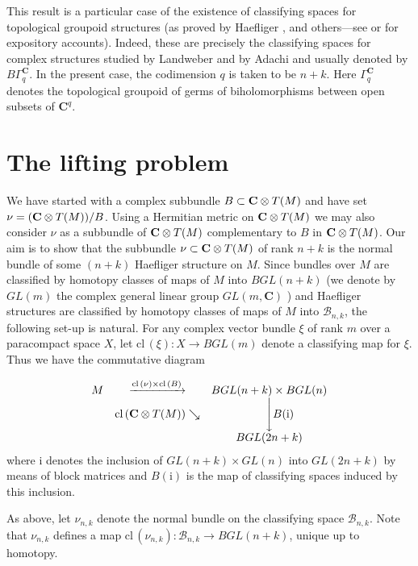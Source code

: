 \documentclass{amsart}
\begin{document}
This result is a particular case  of  the existence of classifying
spaces for topological groupoid structures (as proved by Haefliger \cite{Haef1}, \cite{Haef2} and
others---see \cite[page 48]{La2} or \cite[page 312]{Milnor} for
expository accounts).  Indeed, 
these are precisely the classifying spaces  for complex structures studied by
Landweber \cite{Land} and by Adachi \cite{Ad} and usually denoted by $B\Gamma_q^{\mathbf{C}}$.  In the present case, the codimension $q$ is taken to be $n+k$.  
Here $\Gamma_q^{\mathbf{C}}$ denotes the topological groupoid of germs of biholomorphisms between open subsets of 
${\mathbf{C}} ^q$.  

\section{The lifting problem}\label{lift}

We have started with a complex subbundle $B\subset {{\bf{C}}\otimes T(M)}$ and have set $\nu= ({{\bf{C}}\otimes T(M)})
/B$.  Using a Hermitian metric on ${{\bf{C}}\otimes T(M)}$ we may also consider $\nu$ as a
subbundle of ${{\bf{C}}\otimes T(M)}$ complementary to $B$ in ${{\bf{C}}\otimes T(M)}$.  Our aim is to show that the subbundle $\nu
\subset {{\bf{C}}\otimes T(M)}$ of rank $n+k$ is the normal bundle of some $(n+k)$
Haefliger structure on $M$.  Since bundles over $M$ are classified by homotopy
classes of maps of $M$ into $BGL(n+k)$ (we denote by $GL(m)$ the complex general linear group 
$GL(m,\mathbf C)$ ) and Haefliger structures are
classified by homotopy classes of maps of $M$ into ${{\mathcal B}}_{n,k}$, the
following set-up is natural.
For any complex vector bundle $\xi$ of rank $m$ over a paracompact space $X$, let
$\mathrm{cl}\,(\xi): X \to BGL(m)$ denote a classifying map for $\xi$.  
Thus we have the commutative
diagram

\[

\begin{array}{ccc}
M&\xrightarrow{\scriptstyle{\mathrm{cl}\,(\nu)\times \mathrm{cl}\,(B) }}&BGL(n+k)\times BGL(n)\\
&\textrm{cl}\,({{\bf{C}}\otimes T(M)})
\searrow &\Bigg\downarrow\rlap{$B(\mathrm{i})$}\\
& & BGL(2n+k)  
\end{array}
\]
where i denotes the inclusion of $GL(n+k) \times GL(n)$ into $GL(2n+k)$ by means of block matrices and 
$B(\textrm{i})$ is the map of classifying spaces induced by this inclusion.  

As above, let
$\nu _{n,k}$ denote the normal bundle on the classifying space
${{\mathcal B}}_{n,k}$.  Note that $\nu _{n,k}$ defines a map $\mathrm{cl}\,(\nu_{n,k}) : {{\mathcal B}}_{n,k} \to BGL(n+k)$,
unique up to homotopy.
\end{document}
